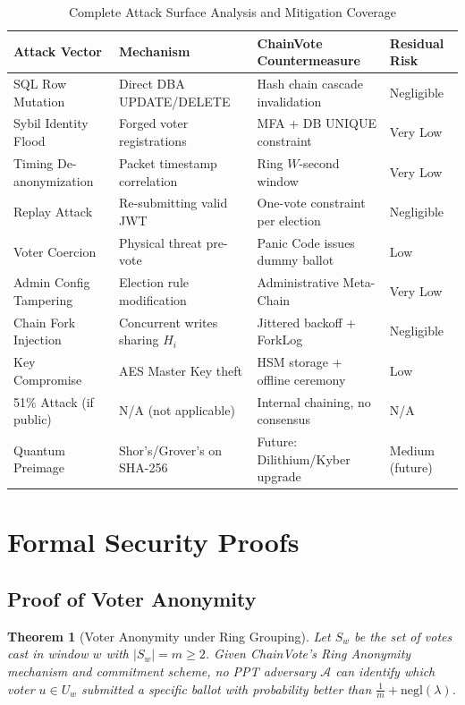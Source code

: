 \documentclass[journal,10pt,twocolumn]{IEEEtran}
\newtheorem{theorem}{Theorem}
\begin{document}
\begin{table}[t]
\caption{Complete Attack Surface Analysis and Mitigation Coverage}
\label{tab:attack_surface}
\begin{tabularx}{\linewidth}{|l|X|X|l|}
\hline
\rowcolor{chainblue!15}
\textbf{Attack Vector} & \textbf{Mechanism} & \textbf{ChainVote Countermeasure} & \textbf{Residual Risk} \\
\hline
SQL Row Mutation & Direct DBA UPDATE/DELETE & Hash chain cascade invalidation & Negligible \\
\hline
Sybil Identity Flood & Forged voter registrations & MFA + DB UNIQUE constraint & Very Low \\
\hline
Timing De-anonymization & Packet timestamp correlation & Ring $W$-second window & Very Low \\
\hline
Replay Attack & Re-submitting valid JWT & One-vote constraint per election & Negligible \\
\hline
Voter Coercion & Physical threat pre-vote & Panic Code issues dummy ballot & Low \\
\hline
Admin Config Tampering & Election rule modification & Administrative Meta-Chain & Very Low \\
\hline
Chain Fork Injection & Concurrent writes sharing $H_i$ & Jittered backoff + ForkLog & Negligible \\
\hline
Key Compromise & AES Master Key theft & HSM storage + offline ceremony & Low \\
\hline
51\% Attack (if public) & N/A (not applicable) & Internal chaining, no consensus & N/A \\
\hline
Quantum Preimage & Shor's/Grover's on SHA-256 & Future: Dilithium/Kyber upgrade & Medium (future) \\
\hline
\end{tabularx}
\end{table}

\section{Formal Security Proofs}

\subsection{Proof of Voter Anonymity}

\begin{theorem}[Voter Anonymity under Ring Grouping]
Let $S_w$ be the set of votes cast in window $w$ with $|S_w| = m \ge 2$. Given ChainVote's Ring Anonymity mechanism and commitment scheme, no PPT adversary $\mathcal{A}$ can identify which voter $u \in U_w$ submitted a specific ballot with probability better than $\frac{1}{m} + \mathrm{negl}(\lambda)$.
\end{theorem}
\end{document}
